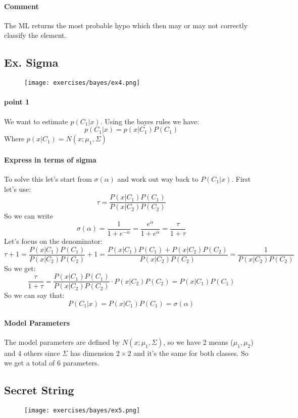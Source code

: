 \paragraph{Comment}
The ML returns the most probable hypo which then may or may not correctly classify the element.

\subsection{Ex. Sigma}
\begin{figure}[H]
    \centering
    \texttt{[image: exercises/bayes/ex4.png]}
\end{figure}

\paragraph{point 1}
We want to estimate $p(C_1|x)$. Using the bayes rules we have:
$$p(C_1|x)=p(x|C_1)P(C_1)$$
Where $p(x|C_1)=N(x;\mu_1, \Sigma)$

\paragraph{Express in terms of sigma}
To solve this let's start from $\sigma(\alpha)$ and work out way back to $P(C_1|x)$. First let's use:
$$\tau=\frac{P(x|C_1)P(C_1)}{P(x|C_2)P(C_2)}$$
So we can write
$$\sigma(\alpha)=\frac{1}{1+e^{-\alpha}}=\frac{e^{\alpha}}{1+e^{\alpha}}=\frac{\tau}{1+\tau}$$
Let's focus on the denominator:
$$\tau+1=\frac{P(x|C_1)P(C_1)}{P(x|C_2)P(C_2)}+1=\frac{P(x|C_1)P(C_1)+P(x|C_2)P(C_2)}{P(x|C_2)P(C_2)}=\frac{1}{P(x|C_2)P(C_2)}$$
So we get:
$$\frac{\tau}{1+\tau}=\frac{P(x|C_1)P(C_1)}{P(x|C_2)P(C_2)}\cdot P(x|C_2)P(C_2)=P(x|C_1)P(C_1)$$
So we can say that:
$$P(C_1|x)=P(x|C_1)P(C_1)=\sigma(\alpha)$$

\paragraph{Model Parameters}
The model parameters are defined by $N(x;\mu_1, \Sigma)$, so we have 2 means ($\mu_1,\mu_2$) and 4 others since $\Sigma$ has dimension $2 \times 2$ and it's the same for both classes. So we get a total of 6 parameters.

\subsection{Secret String}
\begin{figure}[H]
    \centering
    \texttt{[image: exercises/bayes/ex5.png]}
\end{figure}

